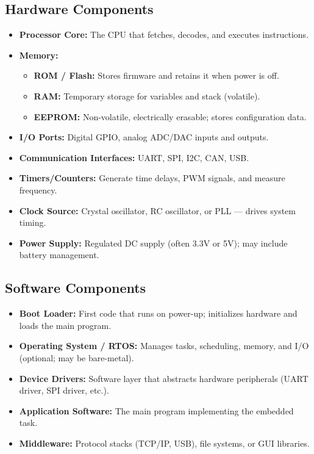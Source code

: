 \documentclass[12pt,a4paper]{article}
\begin{document}
\subsection{Hardware Components}
\begin{itemize}[leftmargin=*, itemsep=3pt]
  \item \textbf{Processor Core:} The CPU that fetches, decodes, and executes instructions.
  \item \textbf{Memory:}
    \begin{itemize}[itemsep=2pt]
      \item \textbf{ROM / Flash:} Stores firmware and retains it when power is off.
      \item \textbf{RAM:} Temporary storage for variables and stack (volatile).
      \item \textbf{EEPROM:} Non-volatile, electrically erasable; stores configuration data.
    \end{itemize}
  \item \textbf{I/O Ports:} Digital GPIO, analog ADC/DAC inputs and outputs.
  \item \textbf{Communication Interfaces:} UART, SPI, I2C, CAN, USB.
  \item \textbf{Timers/Counters:} Generate time delays, PWM signals, and measure frequency.
  \item \textbf{Clock Source:} Crystal oscillator, RC oscillator, or PLL --- drives system timing.
  \item \textbf{Power Supply:} Regulated DC supply (often 3.3V or 5V); may include battery management.
\end{itemize}

\subsection{Software Components}
\begin{itemize}[leftmargin=*, itemsep=3pt]
  \item \textbf{Boot Loader:} First code that runs on power-up; initializes hardware and loads the main program.
  \item \textbf{Operating System / RTOS:} Manages tasks, scheduling, memory, and I/O (optional; may be bare-metal).
  \item \textbf{Device Drivers:} Software layer that abstracts hardware peripherals (UART driver, SPI driver, etc.).
  \item \textbf{Application Software:} The main program implementing the embedded task.
  \item \textbf{Middleware:} Protocol stacks (TCP/IP, USB), file systems, or GUI libraries.
\end{itemize}
\end{document}
